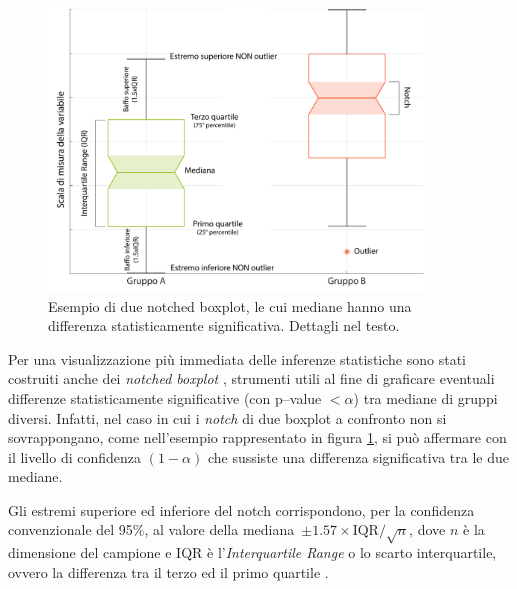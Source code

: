 \begin{figure}[h]
    \centering
    \includegraphics[width=0.9\textwidth]{Figure/esempionotch.pdf}
    \caption{Esempio di due notched boxplot, le cui mediane hanno una differenza statisticamente significativa. Dettagli nel testo.}
    \label{fig:notch}
\end{figure}

Per una visualizzazione più immediata delle inferenze statistiche sono stati costruiti anche dei \emph{notched boxplot} \cite{McGill1978}, strumenti utili al fine di graficare eventuali differenze statisticamente significative (con p--value $< \alpha$) tra mediane di gruppi diversi. Infatti, nel caso in cui i \emph{notch} di due boxplot a confronto non si sovrappongano, come nell'esempio rappresentato in figura \ref{fig:notch}, si può affermare con il livello di confidenza $(1-\alpha)$ che sussiste una differenza significativa tra le due mediane. 

Gli estremi superiore ed inferiore del notch corrispondono, per la confidenza convenzionale del 95$\%$, al valore della mediana~$\pm {1.57 \times \mathrm{IQR}}/{\sqrt{n}} $, dove $n$ è la dimensione del campione e $\mathrm{IQR}$ è l'\textsl{Interquartile Range} o lo scarto interquartile, ovvero la differenza tra il terzo ed il primo quartile \cite{McGill1978}.\\

